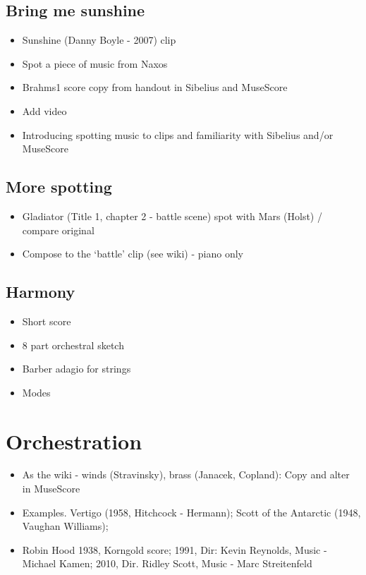 \subsection{Bring me sunshine} 
\begin{itemize}
\item Sunshine (Danny Boyle - 2007) clip 
\item Spot a piece of music from Naxos 
\item Brahms1 score copy from handout in Sibelius and MuseScore 
\item Add video
\item Introducing spotting music to clips and familiarity with Sibelius and/or MuseScore
\end{itemize}


\subsection{More spotting}
\begin{itemize}
\item Gladiator (Title 1, chapter 2 - battle scene) spot with Mars (Holst) / compare original
\item Compose to the `battle' clip (see wiki) - piano only
\end{itemize}

\subsection{Harmony}
\begin{itemize}
\item Short score
\item 8 part orchestral sketch
\item Barber adagio for strings
\item Modes
\end{itemize}

\section{Orchestration}
\begin{itemize}
\item As the wiki - winds (Stravinsky), brass (Janacek, Copland): Copy and alter in MuseScore
\item Examples. Vertigo (1958, Hitchcock - Hermann); Scott of the Antarctic (1948, Vaughan Williams); 
\item Robin Hood 1938, Korngold score; 1991, Dir: Kevin Reynolds, Music - Michael Kamen; 2010, Dir. Ridley Scott, Music - Marc Streitenfeld  
\end{itemize}

